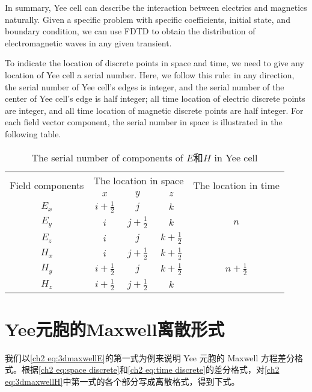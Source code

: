 In summary, Yee cell can describe the interaction between electrics and magnetics naturally. Given a specific problem with specific coefficients, initial state, and boundary condition, we can use FDTD to obtain the distribution of electromagnetic waves in any given transient.

To indicate the location of discrete points in space and time, we need to give any location of Yee cell a serial number. Here, we follow this rule: in any direction, the serial number of Yee cell's edges is integer, and the serial number of the center of Yee cell's edge is half integer; all time location of electric discrete points are integer, and all time location of magnetic discrete points are half integer. For each field vector component, the serial number in space is illustrated in the following table.

\begin{table}
\caption{The serial number of components of $\mathbf{\mathit{E}}$和$\mathbf{\mathit{H}}$ in Yee cell}
	\centering
	\begin{tabular}{ccccc}
		\toprule
		\multirow{2}{3em}{Field components} & \multicolumn{3}{c}{The location in space} & \multirow{2}{6em}{The location in time}\\
		\cline{2-4}
		& $x$ & $y$ & $z$ &\\
		
		\midrule
		$E_x$ & $i+\frac{1}{2}$ & $j$ & $k$ & \multirow{3}{1em}{$n$}\\
		$E_y$ & $i$ & $j+\frac{1}{2}$ & $k$ & \\
		$E_z$ & $i$ & $j$ & $k+\frac{1}{2}$ & \\
		
		$H_x$ & $i$ & $j+\frac{1}{2}$ & $k+\frac{1}{2}$ & \multirow{3}{3em}{$n+\frac{1}{2}$}\\
		$H_y$ & $i+\frac{1}{2}$ & $j$ & $k+\frac{1}{2}$ & \\
		$H_z$ & $i+\frac{1}{2}$ & $j+\frac{1}{2}$ & $k$ & \\		
		\bottomrule
	\end{tabular}
\end{table}

\section{Yee元胞的Maxwell离散形式}

我们以\eqref{ch2 eq:3dmaxwellE}的第一式为例来说明 Yee 元胞的 Maxwell 方程差分格式。根据\eqref{ch2 eq:space discrete}和\linebreak[1]\eqref{ch2 eq:time discrete}的差分格式，对\eqref{ch2 eq:3dmaxwellH}中第一式的各个部分写成离散格式，得到下式。

